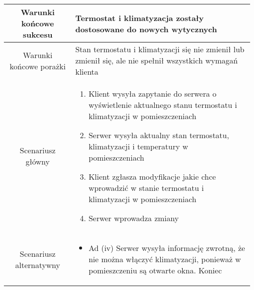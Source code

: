 \documentclass{article}
\begin{document}
\begin{enumerate}
\begin{enumerate}
\begin{table}[H]
\begin{tabular}{|c|p{7cm}|}
						\hline
						Warunki końcowe sukcesu & Termostat i klimatyzacja zostały dostosowane do nowych wytycznych                                                                                                                                                                                                                                                                                                                            \\
						\hline
						Warunki końcowe porażki & Stan termostatu i klimatyzacji się nie zmienił lub zmienił się, ale nie spełnił wszystkich wymagań klienta                                                                                                                                                                                                                                                                                   \\
						Scenariusz główny       & \begin{enumerate}\item Klient wysyła zapytanie do serwera o wyświetlenie aktualnego stanu termostatu i klimatyzacji w pomieszczeniach

\item Serwer wysyła aktualny stan termostatu, klimatyzacji i temperatury w pomieszczeniach

\item Klient zgłasza modyfikacje jakie chce wprowadzić w stanie termostatu i klimatyzacji w pomieszczeniach

\item Serwer wprowadza zmiany\end{enumerate} \\
						\hline
						Scenariusz alternatywny & \begin{itemize}\item Ad (iv) Serwer wysyła informację zwrotną, że nie można włączyć klimatyzacji, ponieważ w pomieszczeniu są otwarte okna. Koniec\end{itemize}                                                                                                                                                                                                                              \\
						\hline
					\end{tabular}
				\end{table}


\end{enumerate}
\end{enumerate}
\end{document}
